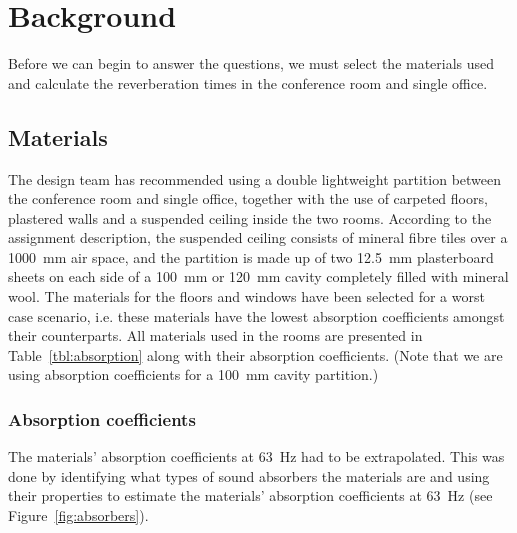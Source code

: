 \section{Background}

Before we can begin to answer the questions, we must select the materials used and calculate the reverberation times in the conference room and single office.



\subsection{Materials}

The design team has recommended using a double lightweight partition between the conference room and single office, together with the use of carpeted floors, plastered walls and a suspended ceiling inside the two rooms.
According to the assignment description, the suspended ceiling consists of mineral fibre tiles over a 1000~mm air space, and the partition is made up of two 12.5~mm plasterboard sheets on each side of a 100~mm or 120~mm cavity completely filled with mineral wool.
The materials for the floors and windows have been selected for a worst case scenario, i.e. these materials have the lowest absorption coefficients amongst their counterparts.
All materials used in the rooms are presented in Table~\ref{tbl:absorption} along with their absorption coefficients.
(Note that we are using absorption coefficients for a 100~mm cavity partition.)






\subsubsection{Absorption coefficients}

The materials' absorption coefficients at 63~Hz had to be extrapolated.
This was done by identifying what types of sound absorbers the materials are and using their properties to estimate the materials' absorption coefficients at 63~Hz (see Figure~\ref{fig:absorbers}).

